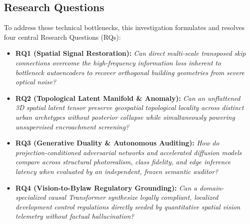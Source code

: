 \documentclass[journal]{IEEEtran}
\begin{document}
\subsection{Research Questions}
To address these technical bottlenecks, this investigation formulates and resolves four central Research Questions (RQs):
\begin{itemize}
    \item \textbf{RQ1 (Spatial Signal Restoration):} \textit{Can direct multi-scale transposed skip connections overcome the high-frequency information loss inherent to bottleneck autoencoders to recover orthogonal building geometries from severe optical noise?}
    \item \textbf{RQ2 (Topological Latent Manifold \& Anomaly):} \textit{Can an unflattened 3D spatial latent tensor preserve geospatial topological locality across distinct urban archetypes without posterior collapse while simultaneously powering unsupervised encroachment screening?}
    \item \textbf{RQ3 (Generative Duality \& Autonomous Auditing):} \textit{How do projection-conditioned adversarial networks and accelerated diffusion models compare across structural photorealism, class fidelity, and edge inference latency when evaluated by an independent, frozen semantic auditor?}
    \item \textbf{RQ4 (Vision-to-Bylaw Regulatory Grounding):} \textit{Can a domain-specialized causal Transformer synthesize legally compliant, localized development control regulations directly seeded by quantitative spatial vision telemetry without factual hallucination?}
\end{itemize}
\end{document}
